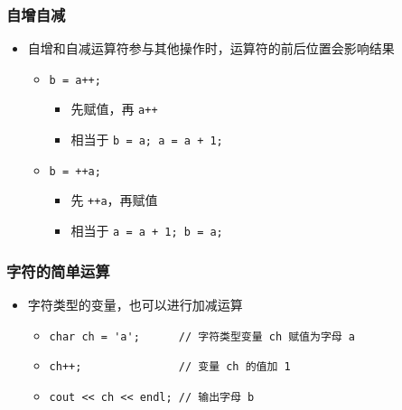 \begin{frame}[fragile]
    \frametitle{自增自减}

    \begin{itemize}
        \item 自增和自减运算符参与其他操作时，运算符的前后位置会影响结果

            \begin{itemize}
                \item<2-> \lstinline|b = a++;|

                    \begin{itemize}
                        \item 先赋值，再 \lstinline|a++|
                        \item 相当于 \lstinline|b = a; a = a + 1;|
                    \end{itemize}

                \item<3-> \lstinline|b = ++a;|

                    \begin{itemize}
                        \item 先 \lstinline|++a|，再赋值
                        \item 相当于 \lstinline|a = a + 1; b = a;|
                    \end{itemize}

            \end{itemize}

    \end{itemize}
\end{frame}

\begin{frame}[fragile]
    \frametitle{字符的简单运算}

    \begin{itemize}
        \item 字符类型的变量，也可以进行加减运算

            \begin{itemize}
                \item \lstinline|char ch = 'a';      // 字符类型变量 ch 赋值为字母 a|
                \item \lstinline|ch++;               // 变量 ch 的值加 1|
                \item \lstinline|cout << ch << endl; // 输出字母 b|
            \end{itemize}
    \end{itemize}
\end{frame}

